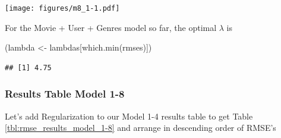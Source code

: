 \documentclass[
]{article}
\newenvironment{Shaded}{}{}
\newcommand{\AttributeTok}[1]{\textcolor[rgb]{0.49,0.56,0.16}{#1}}
\newcommand{\FunctionTok}[1]{\textcolor[rgb]{0.02,0.16,0.49}{#1}}
\newcommand{\NormalTok}[1]{#1}
\newcommand{\OtherTok}[1]{\textcolor[rgb]{0.00,0.44,0.13}{#1}}
\newcommand{\SpecialCharTok}[1]{\textcolor[rgb]{0.25,0.44,0.63}{#1}}
\newcommand{\StringTok}[1]{\textcolor[rgb]{0.25,0.44,0.63}{#1}}
\begin{document}
\begin{Shaded}
\end{Shaded}

\texttt{[image: figures/m8\_1-1.pdf]}

For the Movie + User + Genres model so far, the optimal \(\lambda\) is

\begin{Shaded}
\begin{Highlighting}[]
\NormalTok{(lambda }\OtherTok{\textless{}{-}}\NormalTok{ lambdas[}\FunctionTok{which.min}\NormalTok{(rmses)])}
\end{Highlighting}
\end{Shaded}

\begin{verbatim}
## [1] 4.75
\end{verbatim}

\newpage

\hypertarget{results-table-model-1-8}{%
\subsubsection{Results Table Model 1-8}\label{results-table-model-1-8}}

Let's add Regularization to our Model 1-4 results table to get Table
\ref{tbl:rmse_results_model_1-8} and arrange in descending order of
RMSE's
\end{document}
